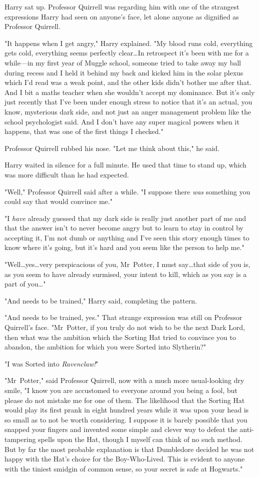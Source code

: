 Harry sat up. Professor Quirrell was regarding him with one of the strangest
expressions Harry had seen on anyone's face, let alone anyone as dignified as
Professor Quirrell.

"It happens when I get angry," Harry explained. "My blood runs cold, everything
gets cold, everything seems perfectly clear…In retrospect it's been
with me for a while---in my first year of Muggle school, someone tried to take
away my ball during recess and I held it behind my back and kicked him in the
solar plexus which I'd read was a weak point, and the other kids didn't bother
me after that. And I bit a maths teacher when she wouldn't accept my dominance.
But it's only just recently that I've been under enough stress to notice that
it's an actual, you know, mysterious dark side, and not just an anger
management problem like the school psychologist said. And I don't have any
super magical powers when it happens, that was one of the first things I
checked."

Professor Quirrell rubbed his nose. "Let me think about this," he said.

Harry waited in silence for a full minute. He used that time to stand up, which
was more difficult than he had expected.

"Well," Professor Quirrell said after a while. "I suppose there \emph{was}
something you could say that would convince me."

"I \emph{have} already guessed that my dark side is really just another part of
me and that the answer isn't to never become angry but to learn to stay in
control by accepting it, I'm not dumb or anything and I've seen this story
enough times to know where it's going, but it's hard and you seem like the
person to help me."

"Well…yes…very perspicacious of you, Mr~Potter, I must
say…that side of you is, as you seem to have already surmised, your
intent to kill, which as you say is a part of you…"

"And needs to be trained," Harry said, completing the pattern.

"And needs to be trained, yes." That strange expression was still on Professor
Quirrell's face. "Mr~Potter, if you truly do not wish to be the next Dark
Lord, then what was the ambition which the Sorting Hat tried to convince you to
abandon, the ambition for which you were Sorted into Slytherin?"

"I was Sorted into \emph{Ravenclaw!}"

"Mr~Potter," said Professor Quirrell, now with a much more usual-looking dry
smile, "I know you are accustomed to everyone around you being a fool, but
please do not mistake me for one of them. The likelihood that the Sorting Hat
would play its first prank in eight hundred years while it was upon your head
is so small as to not be worth considering. I suppose it is barely possible
that you snapped your fingers and invented some simple and clever way to defeat
the anti-tampering spells upon the Hat, though I myself can think of no such
method. But by far the most probable explanation is that Dumbledore decided he
was not happy with the Hat's choice for the Boy-Who-Lived. This is evident to
anyone with the tiniest smidgin of common sense, so your secret is safe at
Hogwarts."


